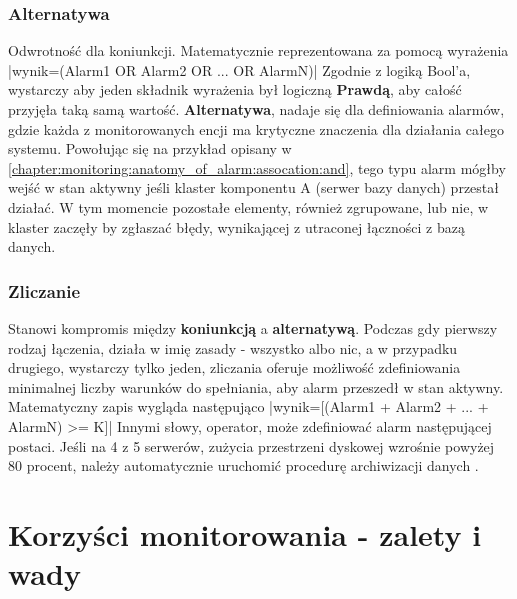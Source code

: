         \subsubsection{Alternatywa}
        Odwrotność dla koniunkcji. Matematycznie reprezentowana za pomocą wyrażenia
        |wynik=(Alarm1 OR Alarm2 OR ... OR AlarmN)|
        Zgodnie z logiką Bool'a, wystarczy aby jeden
        składnik wyrażenia był logiczną \textbf{Prawdą}, aby całość przyjęła taką samą wartość. \textbf{Alternatywa},
        nadaje się dla definiowania alarmów, gdzie każda z monitorowanych encji ma krytyczne znaczenia dla działania całego systemu.
        Powołując się na przykład opisany w \ref{chapter:monitoring:anatomy_of_alarm:assocation:and}, tego typu
        alarm mógłby wejść w stan aktywny jeśli klaster komponentu A (serwer bazy danych) przestał działać. W tym momencie pozostałe
        elementy, również zgrupowane, lub nie, w klaster zaczęły by zgłaszać błędy, wynikającej z utraconej łączności
        z bazą danych.
        
        \subsubsection{Zliczanie}
        Stanowi kompromis między \textbf{koniunkcją} a \textbf{alternatywą}. Podczas gdy pierwszy rodzaj łączenia, działa
        w imię zasady - wszystko albo nic, a w przypadku drugiego, wystarczy tylko jeden, zliczania oferuje możliwość
        zdefiniowania minimalnej liczby warunków do spełniania, aby alarm przeszedł w stan aktywny.
        Matematyczny zapis wygląda następująco
        |wynik=[(Alarm1 + Alarm2 + ... + AlarmN) >= K]|
        Innymi słowy, operator, może zdefiniować alarm następującej postaci. Jeśli na 4 z 5 serwerów, zużycia przestrzeni dyskowej
        wzrośnie powyżej 80 procent, należy automatycznie uruchomić procedurę archiwizacji danych \cite{monitoring_and_alerting}. 

\section{Korzyści monitorowania - zalety i wady}
\label{chapter:monitoring:advantages}

